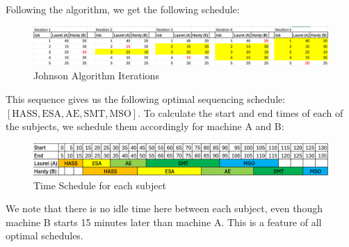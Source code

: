 \documentclass[12pt]{article}
\begin{document}
\noindent Following the algorithm, we get the following schedule:

\begin{figure}[H]
    \centering
    \includegraphics[width=\textwidth]{Images/johnsoniterations.png}
    \caption{Johnson Algorithm Iterations}
    \label{fig:5-johnson}
\end{figure} 

\noindent This sequence gives us the following optimal sequencing schedule: $\left[ \text{HASS}, \text{ESA}, \text{AE}, \text{SMT}, \text{MSO} \right]$. To calculate the start and end times of each of the subjects, we schedule them accordingly for machine A and B: 

\begin{figure}[H]
    \centering
    \includegraphics[width=\textwidth]{Images/schedule.png}
    \caption{Time Schedule for each subject}
    \label{fig:5-schedule}
\end{figure} 

\noindent We note that there is no idle time here between each subject, even though machine B starts 15 minutes later than machine A. This is a feature of all optimal schedules.

\newpage



\end{document}
